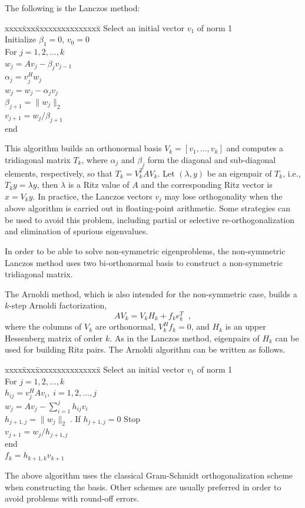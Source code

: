 	The following is the Lanczos method:
\begin{tabbing}
xxxx\=xxx\=xxxxxxxxxxxxxxx\=\kill
\> Select an initial vector $v_1$ of norm 1\\
\> Initialize $\beta_1=0$, $v_0=0$\\
\> For $j=1,2,\ldots,k$\\
\> \> $w_j=Av_j-\beta_j v_{j-1}$ \\
\> \> $\alpha_j=v_j^Hw_j$ \\
\> \> $w_j=w_j-\alpha_j v_j$ \\
\> \> $\beta_{j+1}=\|w_j\|_2$ \\
\> \> $v_{j+1}=w_j/\beta_{j+1}$ \\
\> end
\end{tabbing}
This algorithm builds an orthonormal basis $V_k=[v_1,\ldots,v_k]$ and computes a tridiagonal matrix $T_k$, where $\alpha_j$ and $\beta_j$ form the diagonal and sub-diagonal elements, respectively, so that $T_k=V_k^TAV_k$. Let $(\lambda,y)$ be an eigenpair of $T_k$, i.e., $T_ky=\lambda y$, then $\lambda$ is a Ritz value of $A$ and the corresponding Ritz vector is $x=V_ky$. In practice, the Lanczos vectors $v_j$ may lose orthogonality when the above algorithm is carried out in floating-point arithmetic. Some strategies can be used to avoid this problem, including partial or selective re-orthogonalization and elimination of spurious eigenvalues.

	In order to be able to solve non-symmetric eigenproblems, the non-symmetric Lanczos method uses two bi-orthonormal basis to construct a non-symmetric tridiagonal matrix.

	The Arnoldi method, which is also intended for the non-symmetric case, builds a $k$-step Arnoldi factorization,
\begin{equation}
\label{eq:arn}
AV_k=V_kH_k+f_ke_k^T\;\;,
\end{equation}
where the columns of $V_k$ are orthonormal, $V_k^Hf_k=0$, and $H_k$ is an upper Hessenberg matrix of order $k$. As in the Lanczos method, eigenpairs of $H_k$ can be used for building Ritz pairs. The Arnoldi algorithm can be written as follows.
	\begin{tabbing}
xxxx\=xxx\=xxxxxxxxxxxxxxx\=\kill
\> Select an initial vector $v_1$ of norm 1\\
\> For $j=1,2,\ldots,k$\\
\> \> $h_{ij}=v_j^HAv_i,\;i=1,2,\ldots,j$ \\
\> \> $w_j=Av_j-\sum_{i=1}^j h_{ij}v_i$ \\
\> \> $h_{j+1,j}=\|w_j\|_2\;$.\> If $h_{j+1,j}=0$ Stop \\
\> \> $v_{j+1}=w_j/h_{j+1,j}$ \\
\> end\\
\> $f_k=h_{k+1,k}v_{k+1}$
\end{tabbing}
The above algorithm uses the classical Gram-Schmidt orthogonalization scheme when constructing the basis. Other schemes are usually preferred in order to avoid problems with round-off errors.

